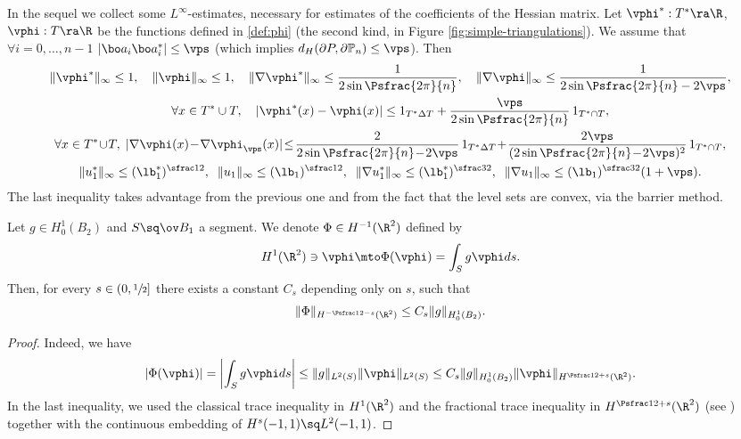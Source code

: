 In the sequel we collect some $L^\infty$-estimates, necessary for estimates of the coefficients of the Hessian matrix.
Let $\vphi^*: T^*\ra \R$, $ \vphi: T \ra \R$ be the functions defined in \eqref{def:phi} (the second kind, in Figure \ref{fig:simple-triangulations}). We assume that $\forall i=0, \dots, n-1$ $|\bo a_i\bo a_i^*|\le \vps$ (which implies $d_H(\partial P, \partial \Bbb P_n) \le \vps$). Then
\begin{gather*}
\|\vphi^*\|_\infty \le 1,\quad \|\vphi\|_\infty \le 1,\quad \|\nabla \vphi^*\|_\infty \le \frac{1}{2 \sin \Psfrac{ {2}\pi}{n}},\quad \|\nabla \vphi\|_\infty \le \frac{1}{2\sin \Psfrac{ {2}\pi}{n}-2\vps},
\\
\forall x\in T^*\cup T,\quad |\vphi^*(x)-\vphi (x)|\le 1_{T^*\Delta T} + \frac{\vps}{2 \sin \Psfrac{ {2}\pi}{n}}\, 1_{T^*\cap T},
\\
\forall x\in T^*\!\cup\! T,\; |\nabla \vphi(x)\!-\!\nabla \vphi_\vps (x)|\!\le\! \frac{2}{2\sin \Psfrac{ {2}\pi}{n}\!-\!2\vps}\,1_{T^*\Delta T} \!+\! \frac{2\vps}{(2 \sin \Psfrac{ {2}\pi}{n}\!-\!2\vps)^2}\,1_{T^*\cap T },
\\
\|u_1^*\|_\infty \le(\lb_1^*)^{\sfrac 12}, \;\; \|u_1 \|_\infty \le (\lb_1)^{\sfrac 12},
\;\;
\|\nabla u_1^*\|_\infty \le (\lb_1^*)^{\sfrac 32}, \;\; \|\nabla u_1 \|_\infty \le (\lb_1)^{\sfrac 32} (1+\vps).
\end{gather*}
The last inequality takes advantage from the previous one and from the fact that the level sets are convex, via the barrier method.

\begin{lemma}\label{bobu26}
Let $g \in H^1_0(B_2)$ and $S \sq \ov B_1$ a segment. We denote $\Phi \in H^{-1} (\R^2)$ defined by\enlargethispage{-2\baselineskip}
\[
H^1(\R^2) \ni \vphi \mto \Phi (\vphi) = \int_S g \vphi ds.
\]
Then, for every $s \in (0, \sfrac 12]$ there exists a constant $C_s$ depending only on $s$, such that
\[
\|\Phi\|_{H^{-\Psfrac 12-s}(\R^2)} \le C_s \|g\|_{H^1_0(B_2)}.
\]
\end{lemma}
\begin{proof}
Indeed, we have
\[
|\Phi (\vphi)| = \left|\int_S g \vphi ds\right|\le \|g\|_{L^2(S)} \|\vphi\|_{L^2(S)}
\le C_s \|g\|_{H^1_0(B_2)} \|\vphi \|_{H^{ \Psfrac 12+s}(\R^2)}.
\]
In the last inequality, we used the classical trace inequality in $H^1(\R^2)$ and the fractional trace inequality in $H^{ \Psfrac 12+s}(\R^2)$ (see \cite[Lem.\,16.1]{Ta07}) together with the continuous embedding of $H^s(-1,1) \sq L^2(-1,1)$.
\end{proof}

